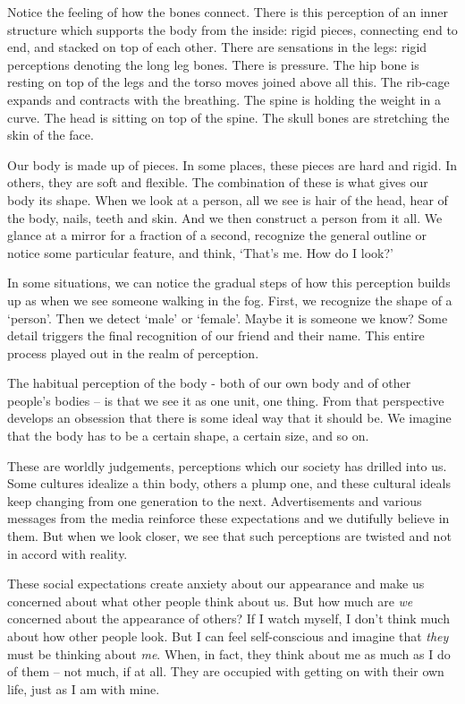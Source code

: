 Notice the feeling of how the bones connect. There is this perception of
an inner structure which supports the body from the inside: rigid
pieces, connecting end to end, and stacked on top of each other. There
are sensations in the legs: rigid perceptions denoting the long leg
bones. There is pressure. The hip bone is resting on top of the legs and
the torso moves joined above all this. The rib-cage expands and
contracts with the breathing. The spine is holding the weight in a
curve. The head is sitting on top of the spine. The skull bones are
stretching the skin of the face.

Our body is made up of pieces. In some places, these pieces are hard and
rigid. In others, they are soft and flexible. The combination of these
is what gives our body its shape. When we look at a person, all we see
is hair of the head, hear of the body, nails, teeth and skin. And we
then construct a person from it all. We glance at a mirror for a
fraction of a second, recognize the general outline or notice some
particular feature, and think, `That's me. How do I look?'

In some situations, we can notice the gradual steps of how this
perception builds up as when we see someone walking in the fog. First,
we recognize the shape of a `person'. Then we detect `male' or `female'.
Maybe it is someone we know? Some detail triggers the final recognition
of our friend and their name. This entire process played out in the
realm of perception.

The habitual perception of the body - both of our own body and of other
people's bodies -- is that we see it as one unit, one thing. From that
perspective develops an obsession that there is some ideal way that it
should be. We imagine that the body has to be a certain shape, a certain
size, and so on.

These are worldly judgements, perceptions which our society has drilled
into us. Some cultures idealize a thin body, others a plump one, and
these cultural ideals keep changing from one generation to the next.
Advertisements and various messages from the media reinforce these
expectations and we dutifully believe in them. But when we look closer,
we see that such perceptions are twisted and not in accord with reality.

These social expectations create anxiety about our appearance and make
us concerned about what other people think about us. But how much are
\emph{we} concerned about the appearance of others? If I watch myself, I
don't think much about how other people look. But I can feel
self-conscious and imagine that \emph{they} must be thinking about
\emph{me}. When, in fact, they think about me as much as I do of them --
not much, if at all. They are occupied with getting on with their own
life, just as I am with mine.

